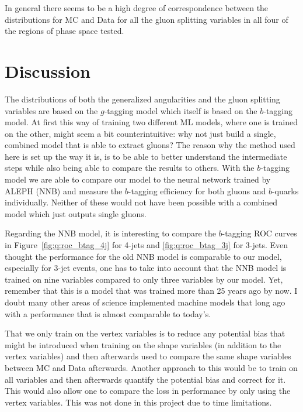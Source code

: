 In general there seems to be a high degree of correspondence between the distributions for MC and Data for all the gluon splitting variables in all four of the regions of phase space tested. 



\section{Discussion}
\label{sec:q:discussion}

The distributions of both the generalized angularities and the gluon splitting variables are based on the $g$-tagging model which itself is based on the $b$-tagging model. At first this way of training two different ML models, where one is trained on the other, might seem a bit counterintuitive: why not just build a single, combined model that is able to extract gluons? The reason why the method used here is set up the way it is, is to be able to better understand the intermediate steps while also being able to compare the results to others. With the $b$-tagging model we are able to compare our model to the neural network trained by ALEPH (NNB) and measure the $b$-tagging efficiency for both gluons and $b$-quarks individually. Neither of these would not have been possible with a combined model which just outputs single gluons. 

Regarding the NNB model, it is interesting to compare the $b$-tagging ROC curves in Figure~\ref{fig:q:roc_btag_4j} for 4-jets and \ref{fig:q:roc_btag_3j} for 3-jets. Even thought the performance for the old NNB model is comparable to our model, especially for 3-jet events, one has to take into account that the NNB model is trained on nine variables compared to only three variables by our model. Yet, remember that this is a model that was trained more than \num{25} years ago by now. I doubt many other areas of science implemented machine models that long ago with a performance that is almost comparable to today's.

That we only train on the vertex variables is to reduce any potential bias that might be introduced when training on the shape variables (in addition to the vertex variables) and then afterwards used to compare the same shape variables between MC and Data afterwards. Another approach to this would be to train on all variables and then afterwards quantify the potential bias and correct for it. This would also allow one to compare the loss in performance by only using the vertex variables. This was not done in this project due to time limitations.

